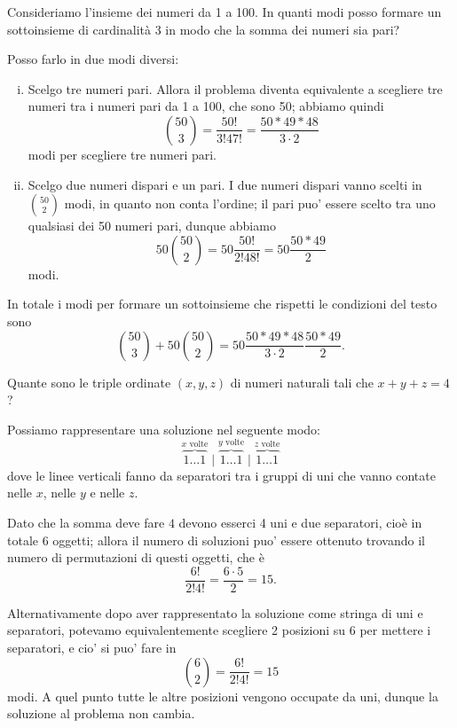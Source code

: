 \begin{example}
    Consideriamo l'insieme dei numeri da 1 a 100. In quanti modi posso formare un sottoinsieme di cardinalità 3 in modo che la somma dei numeri sia pari?
\end{example}
\begin{solution}
    Posso farlo in due modi diversi:
    \begin{enumerate}[(i)]
        \item Scelgo tre numeri pari. Allora il problema diventa equivalente a scegliere tre numeri tra i numeri pari da 1 a 100, che sono 50; abbiamo quindi \[
            \binom{50}{3} = \frac{50!}{3!47!} = \frac{50 * 49 * 48}{3 \cdot 2}   
        \] modi per scegliere tre numeri pari.
        \item Scelgo due numeri dispari e un pari. I due numeri dispari vanno scelti in $\binom{50}{2}$ modi, in quanto non conta l'ordine; il pari puo' essere scelto tra uno qualsiasi dei 50 numeri pari, dunque abbiamo \[
            50\binom{50}{2} = 50\frac{50!}{2!48!} = 50\frac{50 * 49}{2}
        \] modi.
    \end{enumerate}
    In totale i modi per formare un sottoinsieme che rispetti le condizioni del testo sono \[
        \binom{50}{3} + 50\binom{50}{2} = 50\frac{50 * 49 * 48}{3 \cdot 2}\frac{50 * 49}{2}.           
    \]
\end{solution}

\begin{example}
    Quante sono le triple ordinate $(x, y , z)$ di numeri naturali tali che $x + y + z = 4$?
\end{example}
\begin{solution}
    Possiamo rappresentare una soluzione nel seguente modo:
    \[
        \overbrace{1 \dots 1}^{x \text{ volte}} \mid   \overbrace{1 \dots 1}^{y \text{ volte}} \mid\overbrace{1 \dots 1}^{z \text{ volte}}
    \] dove le linee verticali fanno da separatori tra i gruppi di uni che vanno contate nelle $x$, nelle $y$ e nelle $z$. 
    
    Dato che la somma deve fare $4$ devono esserci 4 uni e due separatori, cioè in totale 6 oggetti; allora il numero di soluzioni puo' essere ottenuto trovando il numero di permutazioni di questi oggetti, che è \[
        \frac{6!}{2!4!} = \frac{6 \cdot 5}{2} = 15.
    \]

    Alternativamente dopo aver rappresentato la soluzione come stringa di uni e separatori, potevamo equivalentemente scegliere 2 posizioni su 6 per mettere i separatori, e cio' si puo' fare in \[
        \binom{6}{2} = \frac{6!}{2!4!} = 15    
    \] modi. A quel punto tutte le altre posizioni vengono occupate da uni, dunque la soluzione al problema non cambia.
\end{solution}

